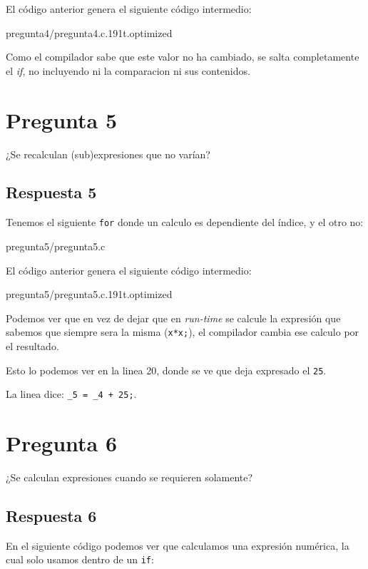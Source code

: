 \documentclass[spanish, fleqn]{article}
\begin{document}
El código anterior genera el siguiente código intermedio:

 {pregunta4/pregunta4.c.191t.optimized}

Como el compilador sabe que este valor no ha cambiado, se salta completamente el \textit{if}, no incluyendo ni la comparacion ni sus contenidos.

\section{Pregunta 5}

¿Se recalculan (sub)expresiones que no varían?

\subsection{Respuesta 5}

Tenemos el siguiente \texttt{for} donde un calculo es dependiente del índice, y el otro no:

 {pregunta5/pregunta5.c}

El código anterior genera el siguiente código intermedio:

 {pregunta5/pregunta5.c.191t.optimized}
    
Podemos ver que en vez de dejar que en \textit{run-time} se calcule la expresión que sabemos que siempre sera la misma (\texttt{x*x;}), el compilador cambia ese calculo por el resultado. 

Esto lo podemos ver en la linea 20, donde se ve que deja expresado el \texttt{25}. 

La linea dice: \texttt{\_5 = \_4 + 25;}.

\section{Pregunta 6}

¿Se calculan expresiones cuando se requieren solamente?

\subsection{Respuesta 6}

En el siguiente código podemos ver que calculamos una expresión numérica, la cual solo usamos dentro de un \texttt{if}:
\end{document}
